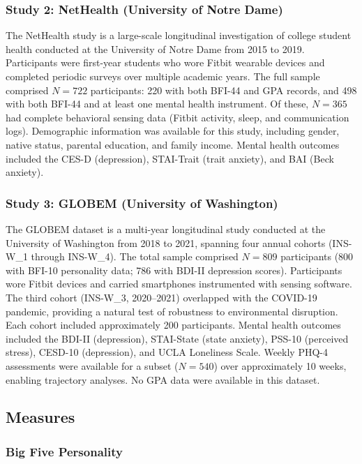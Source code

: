 \documentclass[12pt, a4paper]{article}
\begin{document}
\subsubsection{Study 2: NetHealth (University of Notre Dame)}

The NetHealth study is a large-scale longitudinal investigation of college student health conducted at the University of Notre Dame from 2015 to 2019. Participants were first-year students who wore Fitbit wearable devices and completed periodic surveys over multiple academic years. The full sample comprised $N = 722$ participants: 220 with both BFI-44 and GPA records, and 498 with both BFI-44 and at least one mental health instrument. Of these, $N = 365$ had complete behavioral sensing data (Fitbit activity, sleep, and communication logs). Demographic information was available for this study, including gender, native status, parental education, and family income. Mental health outcomes included the CES-D (depression), STAI-Trait (trait anxiety), and BAI (Beck anxiety).

\subsubsection{Study 3: GLOBEM (University of Washington)}

The GLOBEM dataset \citep{xu2022globem} is a multi-year longitudinal study conducted at the University of Washington from 2018 to 2021, spanning four annual cohorts (INS-W\_1 through INS-W\_4). The total sample comprised $N = 809$ participants (800 with BFI-10 personality data; 786 with BDI-II depression scores). Participants wore Fitbit devices and carried smartphones instrumented with sensing software. The third cohort (INS-W\_3, 2020--2021) overlapped with the COVID-19 pandemic, providing a natural test of robustness to environmental disruption. Each cohort included approximately 200 participants. Mental health outcomes included the BDI-II (depression), STAI-State (state anxiety), PSS-10 (perceived stress), CESD-10 (depression), and UCLA Loneliness Scale. Weekly PHQ-4 assessments were available for a subset ($N = 540$) over approximately 10 weeks, enabling trajectory analyses. No GPA data were available in this dataset.

\subsection{Measures}

\subsubsection{Big Five Personality}
\end{document}
